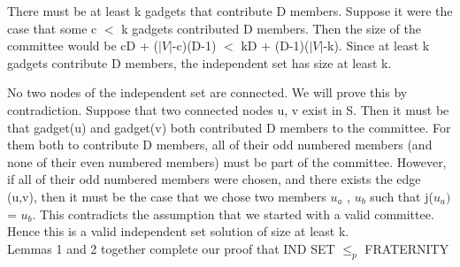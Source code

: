 There must be at least k gadgets that contribute D members. Suppose it were the case that some c $<$ k gadgets contributed D members. Then the size of the committee would be cD + ($|V|$-c)(D-1) $<$ kD + (D-1)($|V|$-k). Since at least k gadgets contribute D members, the independent set has size at least k.

No two nodes of the independent set are connected. We will prove this by contradiction. Suppose that two connected nodes u, v exist in S. Then it must be that gadget(u) and gadget(v) both contributed D members to the committee. For them both to contribute D members, all of their odd numbered members (and none of their even numbered members) must be part of the committee. However, if all of their odd numbered members were chosen, and there exists the edge (u,v), then it must be the case that we chose two members $u_a$ , $u_b$ such that j($u_a)$ = $u_b$. This contradicts the assumption that we started with a valid committee. Hence this is a valid independent set solution of size at least k.\\

Lemmas 1 and 2 together complete our proof that IND SET $\leq_p$ FRATERNITY

